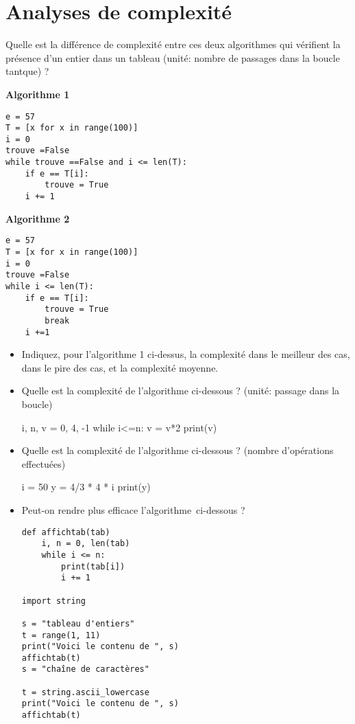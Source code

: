 \section{Analyses de complexité}

 Quelle est la différence de complexité entre ces deux algorithmes qui vérifient la présence d'un entier dans un tableau (unité: nombre de passages dans la boucle tantque) ?

\vspace{0.5cm}

\textbf{Algorithme 1}
\vspace{-0.3cm}
\begin{verbatim}
e = 57
T = [x for x in range(100)]
i = 0
trouve =False
while trouve ==False and i <= len(T):
    if e == T[i]:
        trouve = True
    i += 1
\end{verbatim}


\textbf{Algorithme 2}
\vspace{-0.3cm}

\begin{verbatim}
e = 57
T = [x for x in range(100)]
i = 0
trouve =False
while i <= len(T):
    if e == T[i]:
        trouve = True
        break
    i +=1
\end{verbatim}
\vspace{-0.5cm}
\begin{itemize}
  \item  Indiquez, pour l'algorithme 1 ci-dessus, la complexité dans le meilleur des cas, dans le pire des cas, et la complexité moyenne.
  \item  Quelle est la complexité de l'algorithme ci-dessous ? (unité: passage dans la boucle)

\begin{python}
i, n, v = 0, 4, -1
while i<=n:
    v = v*2
    print(v)
\end{python}
  \item  Quelle est la complexité de l'algorithme ci-dessous ? (nombre d'opérations effectuées)
\begin{python}
i = 50
y = 4/3 * 4 * i
print(y)
\end{python}

  \item  Peut-on rendre plus efficace l'algorithme ci-dessous ?
\begin{verbatim}
def affichtab(tab)
    i, n = 0, len(tab)
    while i <= n:
        print(tab[i])
        i += 1

import string

s = "tableau d'entiers"
t = range(1, 11)
print("Voici le contenu de ", s)
affichtab(t)
s = "chaîne de caractères"

t = string.ascii_lowercase
print("Voici le contenu de ", s)
affichtab(t)
\end{verbatim}
\end{itemize}

